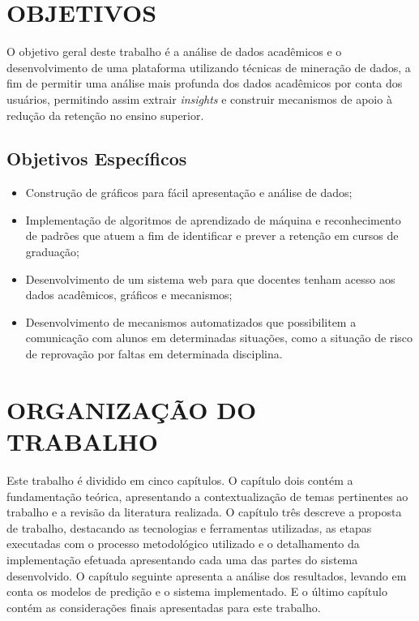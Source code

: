 \section{OBJETIVOS}
\label{sec:objetivos}

O objetivo geral deste trabalho é a análise de dados acadêmicos e o desenvolvimento de uma plataforma utilizando técnicas de mineração de dados, a fim de permitir uma análise mais profunda dos dados acadêmicos por conta dos usuários, permitindo assim extrair \textit{insights} e construir mecanismos de apoio à redução da retenção no ensino superior.

\subsection{Objetivos Específicos}

\begin{itemize}
    \item Construção de gráficos para fácil apresentação e análise de dados;
    \item Implementação de algoritmos de aprendizado de máquina e reconhecimento de padrões que atuem a fim de identificar e prever a retenção em cursos de graduação; 
    \item Desenvolvimento de um sistema web para que docentes tenham acesso aos dados acadêmicos, gráficos e mecanismos;    
    \item Desenvolvimento de mecanismos automatizados que possibilitem a comunicação com alunos em determinadas situações, como a situação de risco de reprovação por faltas em determinada disciplina.
\end{itemize}

\section{ORGANIZAÇÃO DO TRABALHO}
\label{sec:organizacaoTrabalho}

Este trabalho é dividido em cinco capítulos. 
O capítulo dois contém a fundamentação teórica, apresentando a contextualização de temas pertinentes ao trabalho e a revisão da literatura realizada. 
O capítulo três descreve a proposta de trabalho, destacando as tecnologias e ferramentas utilizadas, as etapas executadas com o processo metodológico utilizado e o detalhamento da implementação efetuada apresentando cada uma das partes do sistema desenvolvido.
O capítulo seguinte apresenta a análise dos resultados, levando em conta os modelos de predição e o sistema implementado. 
E o último capítulo contém as considerações finais apresentadas para este trabalho.